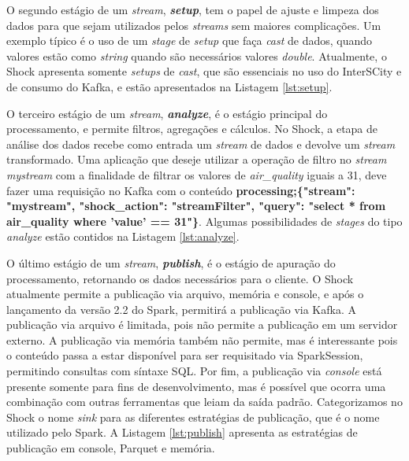 

O segundo estágio de um \textit{stream}, \textit{\textbf{setup}}, tem o papel
de ajuste e limpeza dos dados para que sejam utilizados pelos \textit{streams}
sem maiores complicações. Um exemplo típico é o uso de um \textit{stage} de
\textit{setup} que faça \textit{cast} de dados, quando valores estão como
\textit{string} quando são necessários valores \textit{double}. Atualmente,
o Shock apresenta somente \textit{setups} de \textit{cast}, que são essenciais
no uso do InterSCity e de consumo do Kafka, e estão apresentados na Listagem
\ref{lst:setup}.



O terceiro estágio de um \textit{stream}, \textit{\textbf{analyze}}, é o
estágio principal do processamento, e permite filtros, agregações e cálculos.
No Shock, a etapa de análise dos dados recebe como entrada um \textit{stream}
de dados e devolve um \textit{stream} transformado. Uma aplicação que deseje
utilizar a operação de filtro no \textit{stream} \textit{mystream} com a finalidade
de filtrar os valores de \textit{air\_quality} iguais a 31, deve fazer uma
requisição no Kafka com o conteúdo \small{\textbf{processing;\{"stream": "mystream",
"shock\_action": "streamFilter", "query": "select * from air\_quality where
'value' == 31"\}}}. Algumas possibilidades de \textit{stages} do tipo
\textit{analyze} estão contidos na Listagem \ref{lst:analyze}.



O último estágio de um \textit{stream}, \textit{\textbf{publish}}, é o estágio
de apuração do processamento, retornando os dados necessários para o cliente.
O Shock atualmente permite a publicação via arquivo, memória e console, e após o
lançamento da versão 2.2 do Spark, permitirá a publicação via Kafka. A
publicação via arquivo é limitada, pois não permite a publicação em um servidor
externo. A publicação via memória também não permite, mas é interessante pois
o conteúdo passa a estar disponível para ser requisitado via SparkSession,
permitindo consultas com síntaxe SQL. Por fim, a publicação via \textit{console} está
presente somente para fins de desenvolvimento, mas é possível que ocorra uma
combinação com outras ferramentas que leiam da saída padrão. Categorizamos
no Shock o nome \textit{sink} para as diferentes estratégias de publicação,
que é o nome utilizado pelo Spark. A Listagem \ref{lst:publish} apresenta as
estratégias de publicação em console, Parquet e memória.


